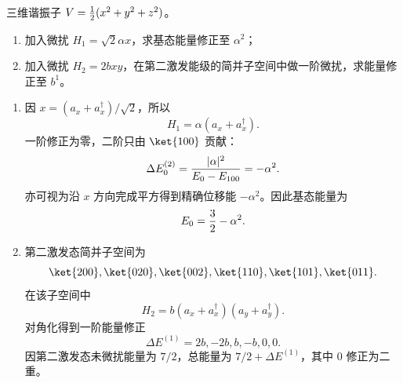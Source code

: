 \begin{question}
三维谐振子 $V={1\over2}(x^2+y^2+z^2)$。
\begin{enumerate}
  \item 加入微扰 $H_1=\sqrt2\alpha x$，求基态能量修正至 $\alpha^2$；
  \item 加入微扰 $H_2=2bxy$，在第二激发能级的简并子空间中做一阶微扰，求能量修正至 $b^1$。
\end{enumerate}
\begin{solution}
\begin{enumerate}
  \item 因 $x=(a_x+a_x^\dagger)/\sqrt2$，所以
  \[
    H_1=\alpha(a_x+a_x^\dagger).
  \]
  一阶修正为零，二阶只由 $\ket{100}$ 贡献：
  \[
    \Delta E_0^{(2)}={|\alpha|^2\over E_0-E_{100}}=-\alpha^2.
  \]
  亦可视为沿 $x$ 方向完成平方得到精确位移能 $-\alpha^2$。因此基态能量为
  \[
    E_0={3\over2}-\alpha^2.
  \]
  \item 第二激发态简并子空间为
  \[
    \ket{200},\ket{020},\ket{002},\ket{110},\ket{101},\ket{011}.
  \]
  在该子空间中
  \[
    H_2=b(a_x+a_x^\dagger)(a_y+a_y^\dagger).
  \]
  对角化得到一阶能量修正
  \[
    \Delta E^{(1)}=2b,-2b,b,-b,0,0.
  \]
  因第二激发态未微扰能量为 $7/2$，总能量为 $7/2+\Delta E^{(1)}$，其中 $0$ 修正为二重。
\end{enumerate}
\end{solution}
\end{question}

